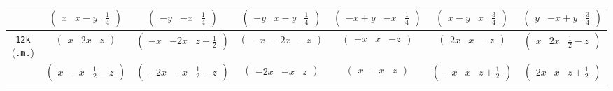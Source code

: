 \documentclass[fleqn,9pt,landscape]{jsarticle}
\begin{document}
\begin{center}
\begin{longtable}{ccccccc}
& $ \begin{pmatrix} x & x - y & \frac{1}{4} \end{pmatrix} $ & $ \begin{pmatrix} - y & - x & \frac{1}{4} \end{pmatrix} $ & $ \begin{pmatrix} - y & x - y & \frac{1}{4} \end{pmatrix} $ & $ \begin{pmatrix} - x + y & - x & \frac{1}{4} \end{pmatrix} $ & $ \begin{pmatrix} x - y & x & \frac{3}{4} \end{pmatrix} $ & $ \begin{pmatrix} y & - x + y & \frac{3}{4} \end{pmatrix} $ \\ \hline
{\tt 12k} ({\tt .m.}) & $ \begin{pmatrix} x & 2 x & z \end{pmatrix} $ & $ \begin{pmatrix} - x & - 2 x & z + \frac{1}{2} \end{pmatrix} $ & $ \begin{pmatrix} - x & - 2 x & - z \end{pmatrix} $ & $ \begin{pmatrix} - x & x & - z \end{pmatrix} $ & $ \begin{pmatrix} 2 x & x & - z \end{pmatrix} $ & $ \begin{pmatrix} x & 2 x & \frac{1}{2} - z \end{pmatrix} $ \\
& $ \begin{pmatrix} x & - x & \frac{1}{2} - z \end{pmatrix} $ & $ \begin{pmatrix} - 2 x & - x & \frac{1}{2} - z \end{pmatrix} $ & $ \begin{pmatrix} - 2 x & - x & z \end{pmatrix} $ & $ \begin{pmatrix} x & - x & z \end{pmatrix} $ & $ \begin{pmatrix} - x & x & z + \frac{1}{2} \end{pmatrix} $ & $ \begin{pmatrix} 2 x & x & z + \frac{1}{2} \end{pmatrix} $ \\ \hline

\end{longtable}
\end{center}
\end{document}
